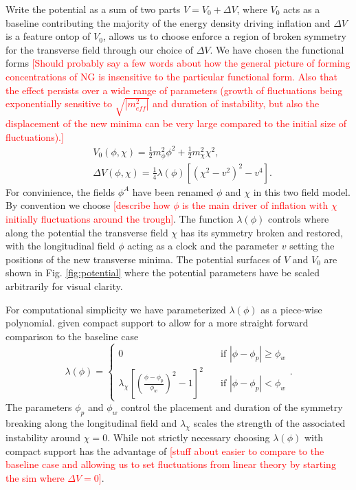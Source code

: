 Write the potential as a sum of two parts $V = V_0 + \Delta V$, where $V_0$ acts as a baseline contributing the majority of the energy density driving inflation and $\Delta V$ is a feature ontop of $V_0$, allows us to choose enforce a region of broken symmetry for the transverse field through our choice of $\Delta V$. We have chosen the functional forms
\textcolor{red}{[Should probably say a few words about how the general picture of forming concentrations of NG is insensitive to the particular functional form. Also that the effect persists over a wide range of parameters (growth of fluctuations being exponentially sensitive to $\sqrt{|m^2_{eff}|}$ and duration of instability, but also the displacement of the new minima can be very large compared to the initial size of fluctuations).]}
\begin{align}
  &V_0(\phi,\chi) = \frac{1}{2}m^2_\phi\phi^2 + \frac{1}{2}m^2_\chi\chi^2, \label{eq:V0} \\
  &\Delta V(\phi,\chi) = \frac{1}{4}\lambda(\phi)\left[ (\chi^2-v^2)^2 - v^4 \right]. \label{eq:DeltaV}
\end{align}
For convinience, the fields $\phi^A$ have been renamed $\phi$ and $\chi$ in this two field model. By convention we choose \textcolor{red}{[describe how $\phi$ is the main driver of inflation with $\chi$ initially fluctuations around the trough]}. The function $\lambda(\phi)$ controls where along the potential the transverse field $\chi$ has its symmetry broken and restored, with the longitudinal field $\phi$ acting as a clock and the parameter $v$ setting the positions of the new transverse minima. The potential surfaces of $V$ and $V_0$ are shown in Fig. \ref{fig:potential} where the potential parameters have be scaled arbitrarily for visual clarity.

For computational simplicity we have parameterized $\lambda(\phi)$ as a piece-wise polynomial. given compact support to allow for a more straight forward comparison to the baseline case
\begin{equation} \label{eq:lambda}
  \lambda(\phi) =
  \begin{cases}
    0 & \quad \text{if } |\phi-\phi_p|\ge\phi_w \\
    \lambda_\chi\left[\left(\frac{\phi-\phi_p}{\phi_w}\right)^2 - 1 \right]^2 & \quad \text{if  } |\phi-\phi_p|<\phi_w
  \end{cases}.
\end{equation}
The parameters $\phi_p$ and $\phi_w$ control the placement and duration of the symmetry breaking along the longitudinal field and $\lambda_\chi$ scales the strength of the associated instability around $\chi=0$. While not strictly necessary choosing $\lambda(\phi)$ with compact support has the advantage of \textcolor{red}{[stuff about easier to compare to the baseline case and allowing us to set fluctuations from linear theory by starting the sim where $\Delta V=0$]}.

